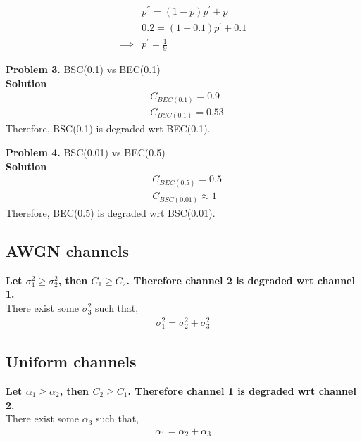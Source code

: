 \documentclass{article}
\begin{document}
\begin{align}
    & p^{''} = (1-p)p^{'} + p \\
    & 0.2 = (1-0.1)p^{'} + 0.1\\
    \implies & p^{'} = \frac{1}{9}
\end{align}

\textbf{Problem 3.} BSC(0.1) vs BEC(0.1)\\
\textbf{Solution} \begin{align}
    &C_{BEC(0.1)} = 0.9 \\
    &C_{BSC(0.1)} = 0.53
\end{align}
Therefore, BSC(0.1) is degraded wrt BEC(0.1).


\textbf{Problem 4.} BSC(0.01) vs BEC(0.5)\\
\textbf{Solution} \begin{align}
    &C_{BEC(0.5)} = 0.5 \\
    &C_{BSC(0.01)} \approx 1
\end{align}
    Therefore, BEC(0.5) is degraded wrt BSC(0.01).

\subsection{AWGN channels}
\textbf{Let $\sigma_{1}^2 \geq \sigma_{2}^2$, then $C_{1} \geq C_{2}$.
Therefore channel 2 is degraded wrt channel 1.} \\
There exist some $\sigma_{3}^2$ such that,
\begin{align}
    \sigma_{1}^2 = \sigma_{2}^2 + \sigma_{3}^2
\end{align}

\subsection{Uniform channels}
\textbf{Let $\alpha_{1} \geq \alpha_{2}$, then $C_{2} \geq C_{1}$.
Therefore channel 1 is degraded wrt channel 2.} \\
There exist some $\alpha_{3}$ such that,
\begin{align}
    \alpha_{1} = \alpha_{2} + \alpha_{3}
\end{align}
\end{document}
